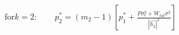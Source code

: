 \documentclass[preview]{standalone}
\begin{document}
\begin{align*}
\text{for} k=2: \qquad p_2^\ast = \left(m_2 - 1\right) \left[p_1^\ast + \frac{P \sigma_\epsilon^2 + W_{tot} \sigma^2}{\left|\hat{h_2}\right|^2}\right]
\end{align*}
\end{document}
